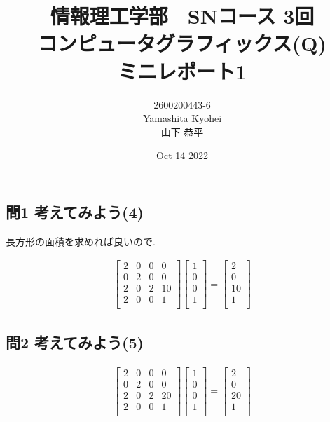 \documentclass[dvipdfmx,autodetect-engine,titlepage]{jsarticle}
\title{情報理工学部　SNコース 3回\\
コンピュータグラフィックス(Q)\\
ミニレポート1\\}
\author{2600200443-6\\Yamashita Kyohei\\山下 恭平}
\date{Oct 14 2022}
\begin{document}
\maketitle

\subsection*{問1 考えてみよう(4)}

長方形の面積を求めれば良いので.

\begin{align}
  \begin{bmatrix}
    2 & 0 & 0 & 0 \\
    0 & 2 & 0 & 0 \\
    2 & 0 & 2 & 10 \\
    2 & 0 & 0 & 1 \\ 
  \end{bmatrix}
  \begin{bmatrix}
    1 \\
    0 \\
    0 \\
    1 \\
  \end{bmatrix}
  =
  \begin{bmatrix}
    2 \\
    0 \\
    10 \\
    1 \\
  \end{bmatrix}
\end{align}

\subsection*{問2 考えてみよう(5)}


\begin{align}
  \begin{bmatrix}
    2 & 0 & 0 & 0 \\
    0 & 2 & 0 & 0 \\
    2 & 0 & 2 & 20 \\
    2 & 0 & 0 & 1 \\ 
  \end{bmatrix}
  \begin{bmatrix}
    1 \\
    0 \\
    0 \\
    1 \\
  \end{bmatrix}
  =
  \begin{bmatrix}
    2 \\
    0 \\
    20 \\
    1 \\
  \end{bmatrix}
\end{align}
\end{document}
